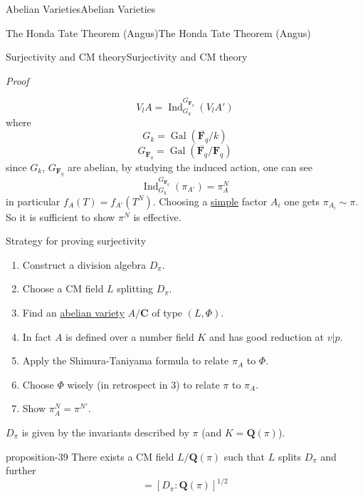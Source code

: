 \documentclass[10pt,]{book}
\makeatletter
\renewcommand*{\proofname}{Proof}
\renewenvironment{proof}[1][\proofname]{\par
  \pushQED{\qed}%
  \normalfont \topsep6\p@\@plus6\p@\relax
  \trivlist
  \item\relax
    {\itshape
    #1\@addpunct{.}}\hspace\labelsep\ignorespaces
}{%
  \popQED\endtrivlist\@endpefalse
}
\numberwithin{equation}{section}
\newcommand{\QQ}{\mathbf{Q}}
\newcommand{\CC}{\mathbf{C}}
\newcommand{\FF}{\mathbf{F}}
\newcommand{\Gal}[2]{\operatorname{Gal}(#1/#2)}
\DeclareMathOperator{\Ind}{Ind}
\makeatother
\begin{document}
\begin{chapterptx}{Abelian Varieties}{}{Abelian Varieties}{}{}
\begin{sectionptx}{The Honda Tate Theorem (Angus)}{}{The Honda Tate Theorem (Angus)}{}{}
\begin{subsectionptx}{Surjectivity and CM theory}{}{Surjectivity and CM theory}{}{}
\begin{proof}
\begin{equation*}
V_l A = \Ind_{G_k}^{G_{\FF_q}} (V_lA')
\end{equation*}
where%
\begin{equation*}
G_k = \Gal{\overline{\FF_q}}{k}
\end{equation*}
%
\begin{equation*}
G_{\FF_q} = \Gal{\overline{\FF_q}}{\FF_q}
\end{equation*}
since \(G_k\), \(G_{\FF_q}\) are abelian, by studying the induced action, one can see%
\begin{equation*}
\Ind_{G_k}^{G_{\FF_q}} (\pi_{A'}) = \pi_A^N
\end{equation*}
in particular \(f_A(T) = f_{A'}(T^N)\). Choosing a \hyperref[def-simple-av]{simple} factor \(A_i\) one gets \(\pi_{A_i} \sim \pi\).%
\end{proof}
\hypertarget{p-436}{}%
So it is sufficient to show \(\pi^N\) is effective.%
\par
\hypertarget{p-437}{}%
Strategy for proving surjectivity\leavevmode%
\begin{enumerate}
\item\hypertarget{li-87}{}Construct a division algebra \(D_\pi\).%
\item\hypertarget{li-88}{}Choose a CM field \(L\) splitting \(D_\pi\).%
\item\hypertarget{li-89}{}Find an \hyperref[def-buntes-abvar]{abelian variety} \(A/\CC\) of type \((L, \Phi)\).%
\item\hypertarget{li-90}{}In fact \(A\) is defined over  a number field \(K\) and has good reduction at \(v|p\).%
\item\hypertarget{li-91}{}Apply the Shimura-Taniyama formula to relate \(\pi_A\) to \(\Phi\).%
\item\hypertarget{li-92}{}Choose \(\Phi\) wisely (in retrospect in 3) to relate \(\pi\) to \(\pi_A\).%
\item\hypertarget{li-93}{}Show \(\pi_A^N = \pi^{N'}\).%
\end{enumerate}
%
\par
\hypertarget{p-438}{}%
\(D_\pi\) is given by the invariants described by \(\pi\) (and \(K = \QQ(\pi)\)).%
\begin{proposition}{}{}{proposition-39}%
\hypertarget{p-439}{}%
There exists a CM field \(L/\QQ(\pi)\) such that \(L\) splits \(D_\pi\) and further%
\begin{equation*}
[L:\QQ(\pi) ] = [ D_\pi: \QQ(\pi)]^{1/2}
\end{equation*}
%
\end{proposition}

\end{subsectionptx}
\end{sectionptx}
\end{chapterptx}
\end{document}
